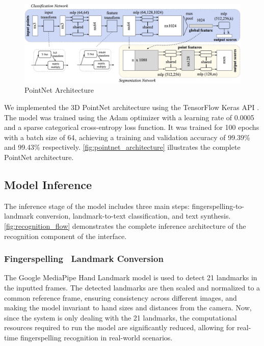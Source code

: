 \documentclass[../paper.tex]{subfiles}
\begin{document}
 \begin{figure}[!htbp]
  \centerline{\includegraphics[width=\linewidth]{../figures/pointnet-architecture.jpg}}
  \caption{PointNet Architecture}\label{fig:pointnet_architecture}
\end{figure}

 We implemented the 3D PointNet architecture using the TensorFlow Keras API \cite{tensorflow,keras}. The model was trained using the Adam optimizer with a learning rate of 0.0005 and a sparse categorical cross-entropy loss function. It was trained for 100 epochs with a batch size of 64, achieving a training and validation accuracy of 99.39\% and 99.43\% respectively. \autoref{fig:pointnet_architecture} illustrates the complete PointNet architecture.

\subsection{Model Inference}
The inference stage of the model includes three main steps: fingerspelling-to-landmark conversion, landmark-to-text classification, and text synthesis. \autoref{fig:recognition_flow} demonstrates the complete inference architecture of the recognition component of the interface.


\subsubsection*{Fingerspelling \textrightarrow\ Landmark Conversion}
The Google MediaPipe Hand Landmark model is used to detect 21 landmarks in the inputted frames. The detected landmarks are then scaled and normalized to a common reference frame, ensuring consistency across different images, and making the model invariant to hand sizes and distances from the camera. Now, since the system is only dealing with the 21 landmarks, the computational resources required to run the model are significantly reduced, allowing for real-time fingerspelling recognition in real-world scenarios.
\end{document}

